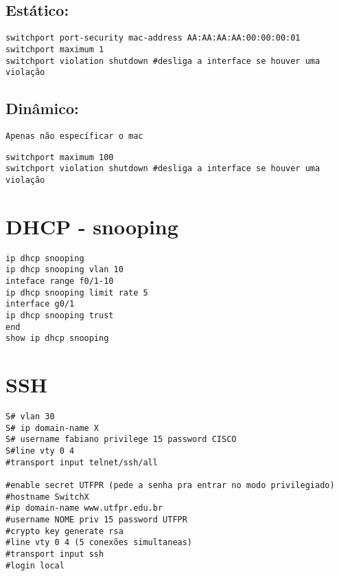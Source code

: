 \documentclass[]{article}
\begin{document}
\hypertarget{estuxe1tico}{%
\subsection{Estático:}\label{estuxe1tico}}

\begin{verbatim}
switchport port-security mac-address AA:AA:AA:AA:00:00:00:01
switchport maximum 1
switchport violation shutdown #desliga a interface se houver uma violação
\end{verbatim}

\hypertarget{dinuxe2mico}{%
\subsection{Dinâmico:}\label{dinuxe2mico}}

\begin{verbatim}
Apenas não específicar o mac
\end{verbatim}

\begin{verbatim}
switchport maximum 100 
switchport violation shutdown #desliga a interface se houver uma violação
\end{verbatim}

\hypertarget{dhcp---snooping}{%
\section{DHCP - snooping}\label{dhcp---snooping}}

\begin{verbatim}
ip dhcp snooping
ip dhcp snooping vlan 10
inteface range f0/1-10
ip dhcp snooping limit rate 5
interface g0/1
ip dhcp snooping trust
end
show ip dhcp snooping
\end{verbatim}

\hypertarget{ssh}{%
\section{SSH}\label{ssh}}

\begin{verbatim}
S# vlan 30 
S# ip domain-name X 
S# username fabiano privilege 15 password CISCO
S#line vty 0 4
#transport input telnet/ssh/all 

#enable secret UTFPR (pede a senha pra entrar no modo privilegiado) 
#hostname SwitchX 
#ip domain-name www.utfpr.edu.br 
#username NOME priv 15 password UTFPR 
#crypto key generate rsa 
#line vty 0 4 (5 conexões simultaneas) 
#transport input ssh 
#login local 
\end{verbatim}
\end{document}
